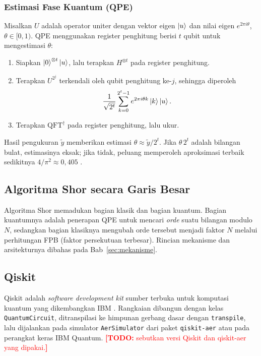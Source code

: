 \documentclass[11pt,a4paper]{article}
\newcommand{\todo}[1]{\textcolor{red}{\textbf{[TODO:} #1\textbf{]}}}
\begin{document}
\subsubsection{Estimasi Fase Kuantum (QPE)}
Misalkan $U$ adalah operator uniter dengan vektor eigen $\ket{u}$ dan nilai
eigen $e^{2\pi i \theta}$, $\theta \in [0, 1)$. QPE menggunakan register
penghitung berisi $t$ qubit untuk mengestimasi $\theta$:
\begin{enumerate}[label=\arabic*.]
  \item Siapkan $\ket{0}^{\otimes t}\ket{u}$, lalu terapkan $H^{\otimes t}$
        pada register penghitung.
  \item Terapkan $U^{2^j}$ terkendali oleh qubit penghitung ke-$j$, sehingga
        diperoleh
        \begin{equation}
          \frac{1}{\sqrt{2^t}} \sum_{k=0}^{2^t-1} e^{2\pi i \theta k}\ket{k}\ket{u}.
        \end{equation}
  \item Terapkan $\mathrm{QFT}^\dagger$ pada register penghitung, lalu ukur.
\end{enumerate}
Hasil pengukuran $\tilde y$ memberikan estimasi $\theta \approx \tilde y / 2^t$.
Jika $\theta\, 2^t$ adalah bilangan bulat, estimasinya eksak; jika tidak,
peluang memperoleh aproksimasi terbaik sedikitnya $4/\pi^2 \approx 0{,}405$
\cite{nielsen2010}.

\subsection{Algoritma Shor secara Garis Besar}
Algoritma Shor memadukan bagian klasik dan bagian kuantum. Bagian kuantumnya
adalah penerapan QPE untuk mencari \emph{orde} suatu bilangan modulo $N$,
sedangkan bagian klasiknya mengubah orde tersebut menjadi faktor $N$ melalui
perhitungan FPB (faktor persekutuan terbesar). Rincian mekanisme dan
arsitekturnya dibahas pada Bab~\ref{sec:mekanisme}.

\subsection{Qiskit}
Qiskit adalah \emph{software development kit} sumber terbuka untuk komputasi
kuantum yang dikembangkan IBM \cite{qiskit2024}. Rangkaian dibangun dengan
kelas \texttt{QuantumCircuit}, ditranspilasi ke himpunan gerbang dasar dengan
\texttt{transpile}, lalu dijalankan pada simulator \texttt{AerSimulator}
dari paket \texttt{qiskit-aer} atau pada perangkat keras IBM Quantum.
\todo{sebutkan versi Qiskit dan qiskit-aer yang dipakai.}
\end{document}
